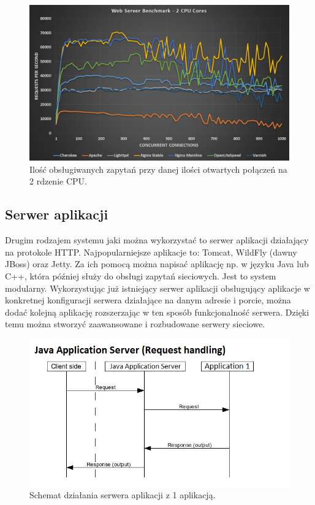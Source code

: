 \documentclass[eng]{mgr}
\begin{document}
			\begin{center}
				\begin{figure}[H]
					\centering
					\includegraphics[scale=0.35]{web-server-performance-benchmark-2-cpu-cores-2.jpg}
					\caption{Ilość obsługiwanych zapytań przy danej ilości otwartych połączeń na 2 rdzenie CPU. \cite{webserverbenchmark}}
				\end{figure}
			\end{center}
		
			\subsection{Serwer aplikacji}
			Drugim rodzajem systemu jaki można wykorzystać to serwer aplikacji działający na protokole HTTP. Najpopularniejsze aplikacje \cite{mostpopularjavaservers} to: Tomcat, WildFly (dawny JBoss) oraz Jetty. Za ich pomocą można napisać aplikację np. w języku Java lub C++, która później służy do obsługi zapytań sieciowych. Jest to system modularny. Wykorzystując już istniejący serwer aplikacji obsługujący aplikacje w konkretnej konfiguracji serwera działające na danym adresie i porcie, można dodać kolejną aplikację rozszerzając w ten sposób funkcjonalność serwera. Dzięki temu można stworzyć zaawansowane i rozbudowane serwery sieciowe.
			
			\begin{center}
				\begin{figure}[H]
					\centering
					\includegraphics[scale=0.8]{flow_jas.png}
					\caption{Schemat działania serwera aplikacji z 1 aplikacją.}
				\end{figure}
			\end{center}
		
\end{document}
